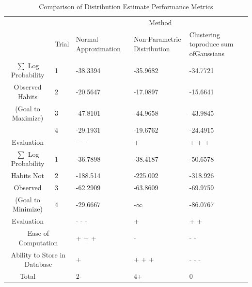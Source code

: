 \documentclass[11pt]{article} %
\begin{document}
\begin{table}[h!]
\vspace{0.5cm}
\caption{Comparison of Distribution Estimate Performance Metrics}
\begin{tabular}{| p{1.25in} | p{.25in} | p{1.25in} | p{1.25in} | p{1.25in} |}
\cline{3-5}
\multicolumn{2}{c}{}&\multicolumn{3}{|c|}{Method} \\
\cline{2-5}
\multicolumn{1}{c|}{}&\multicolumn{1}{|c|}{Trial}&Normal \newline Approximation&Non-Parametric \newline Distribution&Clustering to\newline produce sum of\newline Gaussians\\
\hline
\multicolumn{1}{|c|}{$\sum$ Log Probability} &1&-38.3394&-35.9682&-34.7721 \\
\cline{2-5}
\multicolumn{1}{|c|}{Observed Habits} &2&-20.5647&-17.0897&-15.6641 \\
\cline{2-5}
\multicolumn{1}{|c|}{(Goal to Maximize)} &3&-47.8101&-44.9658&-43.9845 \\
\cline{2-5}
\multicolumn{1}{|c|}{} &4&-29.1931&-19.6762&-24.4915 \\
\hline
\multicolumn{1}{|c}{Evaluation}&&- - -&+&+ + +\\
\hline
\multicolumn{1}{|c|}{$\sum$ Log Probability} &1&-36.7898&-38.4187&-50.6578\\
\cline{2-5}
\multicolumn{1}{|c|}{Habits Not} &2&-188.514&-225.002&-318.926 \\
\cline{2-5}
\multicolumn{1}{|c|}{Observed} &3&-62.2909&-63.8609&-69.9759 \\
\cline{2-5}
\multicolumn{1}{|c|}{(Goal to Minimize)} &4&-29.6667&-$\infty$&-86.0767 \\
\hline
\multicolumn{1}{|c}{Evaluation}&&- - -&+&+ +\\
\hline
\multicolumn{2}{|c|}{Ease of Computation} &+ + + &-&- -\\
\hline
\multicolumn{2}{|c|}{Ability to Store in Database} &+ &+ + +&- - -\\
\hline \hline
\multicolumn{1}{|c}{Total}& &2- &4+&0\\
\hline
\end{tabular}
\label{tab:pugh2}
\end{table}
\end{document}
